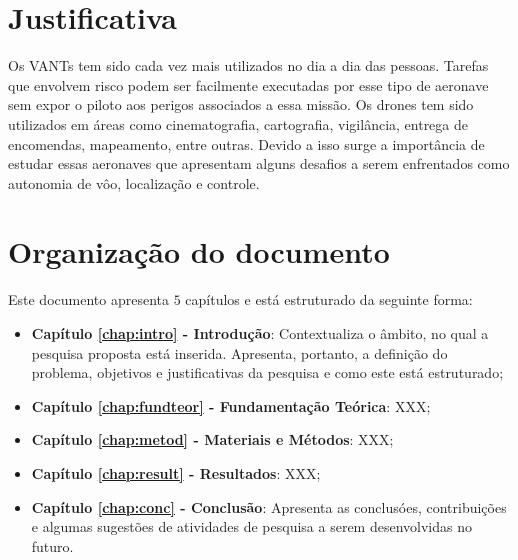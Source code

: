 









\section{Justificativa}
\label{sec:justi}

Os VANTs tem sido cada vez mais utilizados no dia a dia das pessoas. Tarefas que envolvem risco podem ser facilmente executadas por esse tipo de aeronave sem expor o piloto aos perigos associados a essa missão. Os drones tem sido utilizados em áreas como cinematografia, cartografia, vigilância, entrega de encomendas, mapeamento, entre outras. Devido a isso surge a importância de estudar essas aeronaves que apresentam alguns desafios a serem enfrentados como autonomia de vôo, localização e controle.




\section{Organização do documento}
\label{section:organizacao}

Este documento apresenta $5$ capítulos e está estruturado da seguinte forma:

\begin{itemize}

  \item \textbf{Capítulo \ref{chap:intro} - Introdução}: Contextualiza o âmbito, no qual a pesquisa proposta está inserida. Apresenta, portanto, a definição do problema, objetivos e justificativas da pesquisa e como este \thetypeworkthree está estruturado;
  \item \textbf{Capítulo \ref{chap:fundteor} - Fundamentação Teórica}: XXX;
  \item \textbf{Capítulo \ref{chap:metod} - Materiais e Métodos}: XXX;
  \item \textbf{Capítulo \ref{chap:result} - Resultados}: XXX;
  \item \textbf{Capítulo \ref{chap:conc} - Conclusão}: Apresenta as conclusóes, contribuições e algumas sugestões de atividades de pesquisa a serem desenvolvidas no futuro.

\end{itemize}

